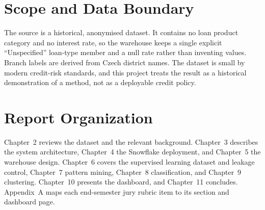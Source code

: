 \section{Scope and Data Boundary}
The source is a historical, anonymised dataset. It contains no loan product category and no interest rate, so the warehouse keeps a single explicit ``Unspecified'' loan-type member and a null rate rather than inventing values. Branch labels are derived from Czech district names. The dataset is small by modern credit-risk standards, and this project treats the result as a historical demonstration of a method, not as a deployable credit policy.

\section{Report Organization}
Chapter~2 reviews the dataset and the relevant background. Chapter~3 describes the system architecture, Chapter~4 the Snowflake deployment, and Chapter~5 the warehouse design. Chapter~6 covers the supervised learning dataset and leakage control, Chapter~7 pattern mining, Chapter~8 classification, and Chapter~9 clustering. Chapter~10 presents the dashboard, and Chapter~11 concludes. Appendix~A maps each end-semester jury rubric item to its section and dashboard page.
